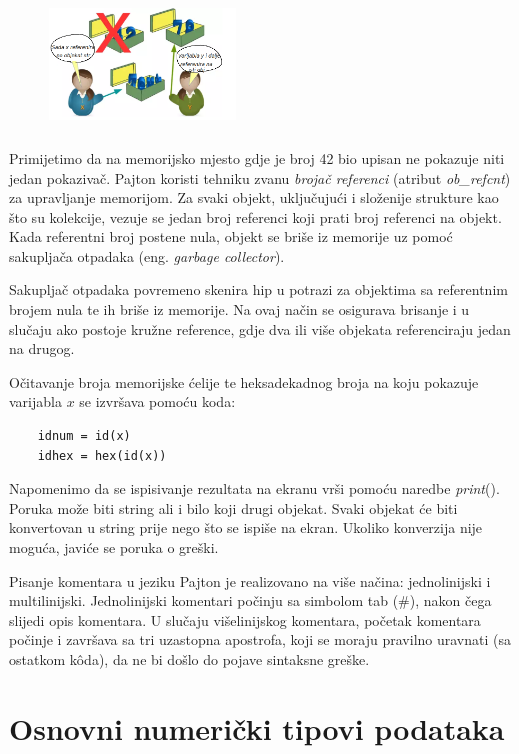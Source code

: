\begin{figure}[H]
	\centering
	\includegraphics[width=140pt,height=100pt]{slike/varX_different_assigned.png}
\end{figure}

Primijetimo da na memorijsko mjesto gdje je broj 42 bio upisan ne pokazuje niti jedan pokazivač.  Pajton koristi tehniku zvanu \textit{brojač referenci} (atribut \textit{ob\_refcnt}) za upravljanje memorijom. Za svaki objekt, uključujući i složenije strukture kao što su kolekcije, vezuje se jedan broj referenci koji prati broj referenci na objekt. Kada referentni broj postene nula, objekt se briše iz memorije uz pomoć sakupljača otpadaka (eng. \textit{garbage collector}).

Sakupljač otpadaka   povremeno skenira hip u potrazi za objektima sa referentnim brojem nula te ih briše   iz memorije. Na ovaj način se osigurava brisanje i u slučaju  ako postoje kružne reference, gdje dva ili više objekata referenciraju jedan na drugog.

Očitavanje broja memorijske ćelije te heksadekadnog broja na koju pokazuje varijabla $x$ se izvršava pomoću koda:
\begin{verbatim}
	idnum = id(x) 
	idhex = hex(id(x)) 
\end{verbatim} 
 Napomenimo da se ispisivanje rezultata na ekranu vrši pomoću naredbe \emph{print}(). Poruka može biti string ali i bilo koji drugi objekat. Svaki objekat će biti konvertovan u string prije nego što se ispiše na ekran. Ukoliko konverzija nije moguća, javiće se poruka o greški. 
 
 Pisanje komentara u jeziku Pajton je realizovano na više načina: jednolinijski i multilinijski. Jednolinijski komentari počinju sa simbolom tab (\#), nakon čega slijedi opis komentara. U slučaju višelinijskog komentara, početak komentara počinje i završava sa tri uzastopna apostrofa, koji se moraju pravilno uravnati (sa ostatkom k\^oda), da ne bi došlo do pojave sintaksne greške.  
 


\section{Osnovni numerički tipovi podataka}

